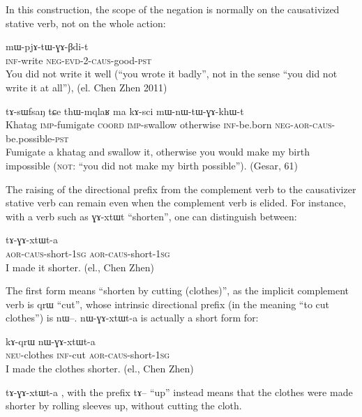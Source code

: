 \documentclass[oldfontcommands,oneside,a4paper,11pt]{memoir}
\newcommand{\ipa}[1]{{\phon #1}} %
\newcommand{\aor}{\textsc{aor}}
\newcommand{\caus}{\textsc{caus}}
\newcommand{\coord}{\textsc{coord}}
\newcommand{\evd}{\textsc{evd}}
\newcommand{\imp}{\textsc{imp}}
\newcommand{\inftv}{\textsc{inf}}
\newcommand{\negat}{\textsc{neg}}
\newcommand{\neu}{\textsc{neu}}
\newcommand{\pst}{\textsc{pst}}
\newcommand{\sg}{\textsc{sg}}
\begin{document}
In this construction, the scope of the negation is normally on the causativized stative verb, not on the whole action:
  \begin{exe}
\ex 
 \gll \ipa{kɤ-rɤt} \ipa{mɯ-pjɤ-tɯ-ɣɤ-βdi-t} \\
\inftv{}-write \negat{}-\evd{}-2-\caus{}-good-\pst{} \\
 \glt    You did not write it well (``you wrote it badly'', not in the sense ``you did not write it at all''), (el. Chen Zhen 2011)
   \end{exe}  
   \begin{exe}
\ex 
 \gll  	 \ipa{khɤdaʁ}  	\ipa{tɤ-sɯfsaŋ}  	\ipa{tɕe}  	\ipa{thɯ-mqlaʁ}  	\ipa{ma}  	\ipa{kɤ-sci}  	\ipa{mɯ-nɯ-tɯ-ɣɤ-khɯ-t}  \\
Khatag \imp{}-fumigate \coord{} \imp{}-swallow otherwise \inftv{}-be.born \negat{}-\aor{}-\caus{}-be.possible-\pst{} \\
 \glt   Fumigate a \ipa{khatag} and swallow it, otherwise you would make my birth impossible (\textsc{not}: ``you did not make my birth possible''). (Gesar, 61)
   \end{exe}  
   
   
   The raising of the directional prefix from the complement verb to the causativizer stative verb can remain even when the complement verb is elided. For instance, with a verb such as \ipa{ɣɤ-xtɯt} ``shorten'', one can distinguish between:
   
   \begin{exe}
\ex 
 \gll  	 \ipa{nɯ-ɣɤ-xtɯt-a} \ipa{tɤ-ɣɤ-xtɯt-a}   	   \\
 \aor{}-\caus{}-short-1\sg{} \aor{}-\caus{}-short-1\sg{} \\
 \glt    I made it shorter. (el., Chen Zhen)
   \end{exe}     
   
 The first form means ``shorten by cutting (clothes)'', as the implicit complement verb is \ipa{qrɯ} ``cut'', whose intrinsic directional prefix (in the meaning ``to cut clothes'') is \ipa{nɯ}--.  \ipa{nɯ-ɣɤ-xtɯt-a} is actually a short form for:
 
   \begin{exe}
\ex 
 \gll  	\ipa{tɯ-ŋga} \ipa{kɤ-qrɯ} \ipa{nɯ-ɣɤ-xtɯt-a}  	   \\
 \neu{}-clothes \inftv{}-cut \aor{}-\caus{}-short-1\sg      \\
 \glt    I made the clothes shorter. (el., Chen Zhen)
   \end{exe}
 \ipa{tɤ-ɣɤ-xtɯt-a} , with the prefix \ipa{tɤ}-- ``up'' instead means that the clothes were made shorter by rolling sleeves up, without cutting the cloth.
 
\end{document}

